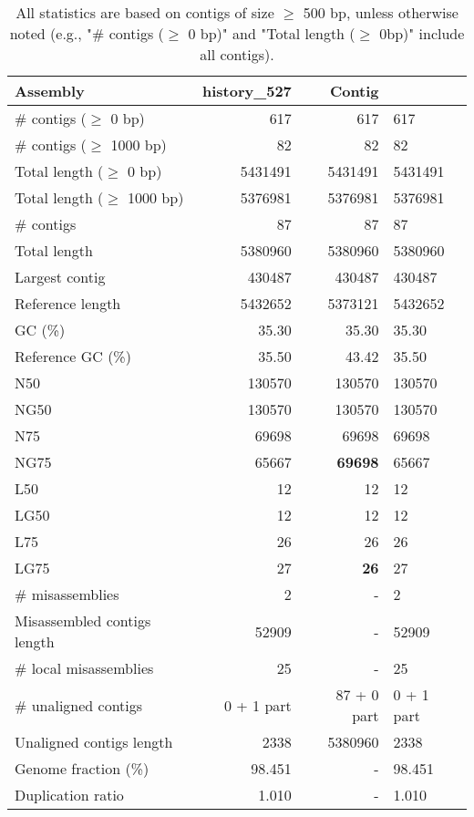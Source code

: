 \documentclass[12pt,a4paper]{article}
\begin{document}
\begin{table}[ht]
\begin{center}
\caption{All statistics are based on contigs of size $\geq$ 500 bp, unless otherwise noted (e.g., "\# contigs ($\geq$ 0 bp)" and "Total length ($\geq$ 0bp)" include all contigs).}
\begin{tabular}{|l*{2}{|r}|}
\hline
Assembly & history\_527 & Contig \\ \hline
\# contigs ($\geq$ 0 bp) & 617 & 617 & 617 \\ \hline
\# contigs ($\geq$ 1000 bp) & 82 & 82 & 82 \\ \hline
Total length ($\geq$ 0 bp) & 5431491 & 5431491 & 5431491 \\ \hline
Total length ($\geq$ 1000 bp) & 5376981 & 5376981 & 5376981 \\ \hline
\# contigs & 87 & 87 & 87 \\ \hline
Total length & 5380960 & 5380960 & 5380960 \\ \hline
Largest contig & 430487 & 430487 & 430487 \\ \hline
Reference length & 5432652 & 5373121 & 5432652 \\ \hline
GC (\%) & 35.30 & 35.30 & 35.30 \\ \hline
Reference GC (\%) & 35.50 & 43.42 & 35.50 \\ \hline
N50 & 130570 & 130570 & 130570 \\ \hline
NG50 & 130570 & 130570 & 130570 \\ \hline
N75 & 69698 & 69698 & 69698 \\ \hline
NG75 & 65667 & {\bf 69698} & 65667 \\ \hline
L50 & 12 & 12 & 12 \\ \hline
LG50 & 12 & 12 & 12 \\ \hline
L75 & 26 & 26 & 26 \\ \hline
LG75 & 27 & {\bf 26} & 27 \\ \hline
\# misassemblies & 2 & - & 2 \\ \hline
Misassembled contigs length & 52909 & - & 52909 \\ \hline
\# local misassemblies & 25 & - & 25 \\ \hline
\# unaligned contigs & 0 + 1 part & 87 + 0 part & 0 + 1 part \\ \hline
Unaligned contigs length & 2338 & 5380960 & 2338 \\ \hline
Genome fraction (\%) & 98.451 & - & 98.451 \\ \hline
Duplication ratio & 1.010 & - & 1.010 \\ \hline

\end{tabular}
\end{center}
\end{table}
\end{document}
